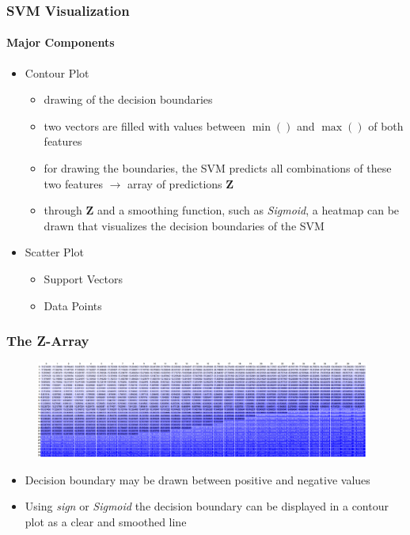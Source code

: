 \documentclass[english,hangout]{beamer}
\begin{document}
\begin{frame}
	\frametitle{SVM Visualization}
	\framesubtitle{Major Components}
	\begin{itemize}
		\item Contour Plot
		\begin{itemize}
			\item drawing of the decision boundaries 
			\item two vectors are filled with values between $\min()$ and $\max()$ of  both features
			\item for drawing the boundaries, the SVM predicts all combinations of these two features $\rightarrow$ array of predictions $\textbf{Z}$
			\item through $\textbf{Z}$ and a smoothing function, such as \textit{Sigmoid}, a heatmap can be drawn that visualizes the decision boundaries of the SVM
		\end{itemize}

		\item Scatter Plot
		\begin{itemize}
			\item Support Vectors
			\item Data Points
		\end{itemize}
	\end{itemize}
\end{frame}

\begin{frame}
	\frametitle{The Z-Array}
	\begin{figure}
		\centering
		\includegraphics[width=11cm]{Z-Array.png}
	\end{figure}
	\begin{itemize}
		\item Decision boundary may be drawn between positive and negative values
		\item Using \textit{sign} or \textit{Sigmoid} the decision boundary can be displayed in a contour plot as a clear and smoothed line
	\end{itemize}
\end{frame}
\end{document}
